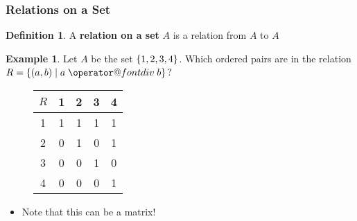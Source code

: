 \documentclass[article, 12pt]{article}
\makeatletter
\theoremstyle{definition}
\newtheorem{example}{Example}
\newtheorem{definition}{Definition}
\DeclarePairedDelimiter\set{\{}{\}}
\newcommand*{\bdiv}{%
  \nonscript\mskip-\medmuskip\mkern5mu%
  \mathbin{\operator@font div}\penalty900\mkern5mu%
  \nonscript\mskip-\medmuskip
}
\makeatother
\begin{document}
    \subsubsection{Relations on a Set}
    \begin{definition}
        A \textbf{relation on a set} $A$ is a relation from $A$ to $A$
    \end{definition}
    \begin{example}
        Let $A$ be the set $\set*{1,2,3,4}$. Which ordered pairs are in the relation $R = \set*{(a,b) \mid a \bdiv b}$?
        \begin{figure}[H]
            \centering
            \begin{tabular}{c|c c c c}
                $R$ & 1 & 2 & 3 & 4 \\
                \hline
                1 & 1 & 1 & 1 & 1 \\
                2 & 0 & 1 & 0 & 1 \\
                3 & 0 & 0 & 1 & 0 \\
                4 & 0 & 0 & 0 & 1 \\
            \end{tabular}
            \label{fig:example 1.1.2}
        \end{figure}
        \begin{itemize}
            \item Note that this can be a matrix!
        \end{itemize}
    \end{example}
\end{document}
